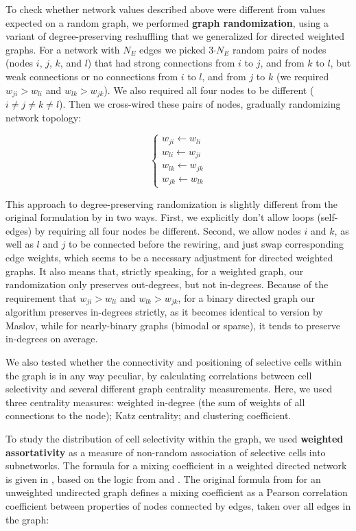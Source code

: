 \documentclass{article}
\begin{document}
To check whether network values described above were different from values expected on a random graph, we performed \textbf{graph randomization}, using a variant of degree-preserving reshuffling \citep{maslov2002} that we generalized for directed weighted graphs. For a network with $N_E$ edges we picked 3$\cdot N_E$ random pairs of nodes (nodes $i$, $j$, $k$, and $l$) that had strong connections from $i$ to $j$, and from $k$ to $l$, but weak connections or no connections from $i$ to $l$, and from $j$ to $k$ (we required $w_{ji}>w_{li}$ and $w_{lk}>w_{jk}$). We also required all four nodes to be different ($i \neq j \neq k \neq l$). Then we cross-wired these pairs of nodes, gradually randomizing network topology:

\[ \left \{ \begin{array}{l}  
w_{ji} \leftarrow w_{li} \\ 
w_{li} \leftarrow w_{ji} \\
w_{lk} \leftarrow w_{jk} \\
w_{jk} \leftarrow w_{lk}
\end{array} \right. \]

This approach to degree-preserving randomization is slightly different from the original formulation by \citep{maslov2002} in two ways. First, we explicitly don’t allow loops (self-edges) by requiring all four nodes be different. Second, we allow nodes $i$ and $k$, as well as $l$ and $j$ to be connected before the rewiring, and just swap corresponding edge weights, which seems to be a necessary adjustment for directed weighted graphs. It also means that, strictly speaking, for a weighted graph, our randomization only preserves out-degrees, but not in-degrees. Because of the requirement that $w_{ji}>w_{li}$ and $w_{lk}>w_{jk}$, for a binary directed graph our algorithm preserves in-degrees strictly, as it becomes identical to version by Maslov, while for nearly-binary graphs (bimodal or sparse), it tends to preserve in-degrees on average.

We also tested whether the connectivity and positioning of selective cells within the graph is in any way peculiar, by calculating correlations between cell selectivity and several different graph centrality measurements. Here, we used three centrality measures: weighted in-degree (the sum of weights of all connections to the node); Katz centrality; and clustering coefficient.

To study the distribution of cell selectivity within the graph, we used \textbf{weighted assortativity} as a measure of non-random association of selective cells into subnetworks. The formula for a mixing coefficient in a weighted directed network is given in \citep{farine2014weighted}, based on the logic from \citep{newman2003mixing} and \citep{leung2007weighted}. The original formula from \citep{newman2003mixing} for an unweighted undirected graph defines a mixing coefficient as a Pearson correlation coefficient between properties of nodes connected by edges, taken over all edges in the graph:
\end{document}
